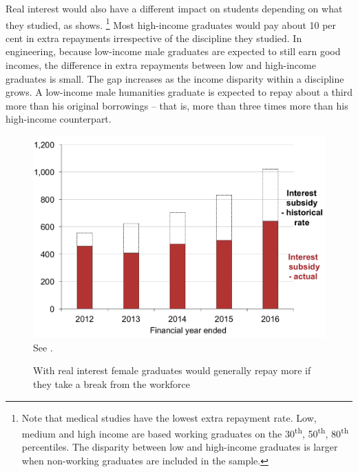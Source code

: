 \documentclass[embargoed]{grattan}
\begin{document}
Real interest would also have a different impact on students depending on what they studied, as  shows.%
\footnote{Note that medical studies have the lowest extra repayment rate.
Low, medium and high income are based working graduates on the 30\textsuperscript{th}, 50\textsuperscript{th}, 80\textsuperscript{th} percentiles.
The disparity between low and high-income graduates is larger when non-working graduates are included in the sample.} Most high-income graduates would pay about 10 per cent in extra repayments irrespective of the discipline they studied.
In engineering, because low-income male graduates are expected to still earn good incomes, the difference in extra repayments between low and high-income graduates is small.
The gap increases as the income disparity within a discipline grows.
A low-income male humanities graduate is expected to repay about a third more than his original borrowings -- that is, more than three times more than his high-income counterpart.

\begin{figure}
\caption{With real interest female graduates would generally repay more if they take a break from the workforce}\label{fig:fig15-with-real-interest-female-grads-would-repay-more-if-they-took-break-from-workforce}


\includegraphics[page=15]{atlas/Chartpack.pdf}
{See .}
\end{figure}
\end{document}
